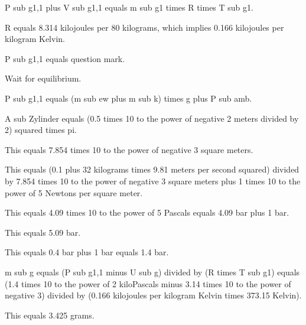 P sub g1,1 plus V sub g1,1 equals m sub g1 times R times T sub g1.

R equals 8.314 kilojoules per 80 kilograms, which implies 0.166 kilojoules per kilogram Kelvin.

P sub g1,1 equals question mark.

Wait for equilibrium.

P sub g1,1 equals (m sub ew plus m sub k) times g plus P sub amb.

A sub Zylinder equals (0.5 times 10 to the power of negative 2 meters divided by 2) squared times pi.

This equals 7.854 times 10 to the power of negative 3 square meters.

This equals (0.1 plus 32 kilograms times 9.81 meters per second squared) divided by 7.854 times 10 to the power of negative 3 square meters plus 1 times 10 to the power of 5 Newtons per square meter.

This equals 4.09 times 10 to the power of 5 Pascals equals 4.09 bar plus 1 bar.

This equals 5.09 bar.

This equals 0.4 bar plus 1 bar equals 1.4 bar.

m sub g equals (P sub g1,1 minus U sub g) divided by (R times T sub g1) equals (1.4 times 10 to the power of 2 kiloPascals minus 3.14 times 10 to the power of negative 3) divided by (0.166 kilojoules per kilogram Kelvin times 373.15 Kelvin).

This equals 3.425 grams.
